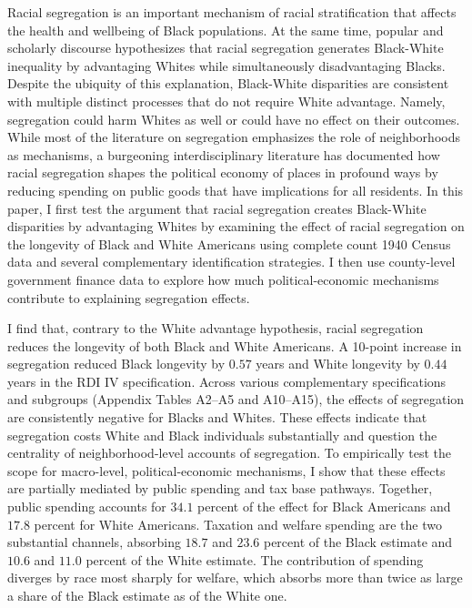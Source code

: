 \documentclass[11pt]{article}
\begin{document}
Racial segregation is an important mechanism of racial stratification that affects the health and wellbeing of Black populations. At the same time, popular and scholarly discourse hypothesizes that racial segregation generates Black-White inequality by advantaging Whites while simultaneously disadvantaging Blacks. Despite the ubiquity of this explanation, Black-White disparities are consistent with multiple distinct processes that do not require White advantage. Namely, segregation could harm Whites as well or could have no effect on their outcomes. While most of the literature on segregation emphasizes the role of neighborhoods as mechanisms, a burgeoning interdisciplinary literature has documented how racial segregation shapes the political economy of places in profound ways by reducing spending on public goods that have implications for all residents. In this paper, I first test the argument that racial segregation creates Black-White disparities by advantaging Whites by examining the effect of racial segregation on the longevity of Black and White Americans using complete count 1940 Census data and several complementary identification strategies. I then use county-level government finance data to explore how much political-economic mechanisms contribute to explaining segregation effects. 

I find that, contrary to the White advantage hypothesis, racial segregation reduces the longevity of both Black and White Americans. A 10-point increase in segregation reduced Black longevity by $0.57$ years and White longevity by $0.44$ years in the RDI IV specification. Across various complementary specifications and subgroups (Appendix Tables A2--A5 and A10--A15), the effects of segregation are consistently negative for Blacks and Whites. These effects indicate that segregation costs White and Black individuals substantially and question the centrality of neighborhood-level accounts of segregation. To empirically test the scope for macro-level, political-economic mechanisms, I show that these effects are partially mediated by public spending and tax base pathways. Together, public spending accounts for $34.1$ percent of the effect for Black Americans and $17.8$ percent for White Americans. Taxation and welfare spending are the two substantial channels, absorbing $18.7$ and $23.6$ percent of the Black estimate and $10.6$ and $11.0$ percent of the White estimate. The contribution of spending diverges by race most sharply for welfare, which absorbs more than twice as large a share of the Black estimate as of the White one.
\end{document}

